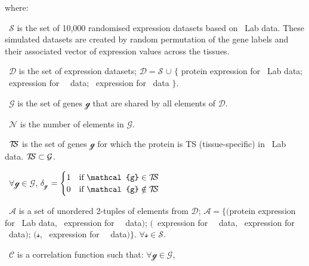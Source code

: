     where:
     \quad\begin{eqlist}[\setlength{\itemsep}{0em}%
         \setlength{\topsep}{0em}%
         \setlength{\partopsep}{0em}%
         \setlength{\parskip}{0em}%
         \setlength{\parsep}{0em}]
         \item[\textbullet\ $\mathcal{S}$] is the set of 10,000
             randomised expression datasets based on \pandey\ Lab data.
             These simulated datasets are created
             by random permutation of the gene labels and
             their associated vector of expression values across the tissues.
         \item[\textbullet\ $\mathcal{D}$] is the set of expression datasets;
             $\mathcal{D}=\mathcal{S}$ $\cup$
             $\{$ protein expression for \pandey\ Lab data;
             \mRNA\ expression for \uhlen\ \etal\ data;
             \mRNA\ expression for \gtex\ data $\}$.
         \item[\textbullet\ $\mathcal{G}$] is the set of genes $\mathcal{g}$
             that are shared by all elements of $\mathcal{D}$.
         \item[\textbullet\ $\mathcal{N}$] is the number of elements
             in $\mathcal{G}$.
         \item[\textbullet\ $\TSm$] is the set of genes $\mathcal{g}$
             for which the protein is \gls{TS} (tissue-specific)
             in \pandey\ Lab data.
             $\TSm \subset \mathcal{G}$.
         \item[\textbullet\ $\forall \mathcal{g} \in \mathcal{G}$,
             $\delta_{\mathcal{g}}$]$=\begin{cases}
                 1 & \text{if $\mathcal{g} \in \TSm$}\\
                 0 & \text{if $\mathcal{g} \notin \TSm$}
 \end{cases}       $
         \item[\textbullet\ $\mathcal{A}$] is a set of unordered 2-tuples
              of elements from $\mathcal{D}$;
              $\mathcal{A}=\{($protein expression for \pandey\ Lab data,
              \mRNA\ expression for \uhlen\ \etal\ data$)$;
              $($\mRNA\ expression for \uhlen\ \etal\ data,
              \mRNA\ expression for \gtex\ data$)$;
              $(\mathcal{s}$,
              \mRNA\ expression for \uhlen\ \etal\ data$)\}$.
              $\forall \mathcal{s} \in \mathcal{S}$.
         \item[\textbullet\ $\mathcal{C}$] is a correlation function such that:
             $\forall \mathcal{g} \in \mathcal{G}$,

\end{eqlist}
